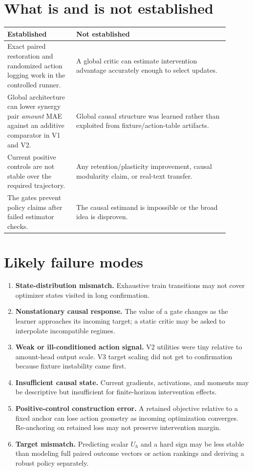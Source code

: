 \documentclass[11pt]{article}
\begin{document}
\section{What is and is not established}
\begin{tabular}{p{0.28\linewidth}p{0.62\linewidth}}
\toprule
Established & Not established\\
\midrule
Exact paired restoration and randomized action logging work in the controlled runner. & A global critic can estimate intervention advantage accurately enough to select updates.\\
Global architecture can lower synergy pair \emph{amount} MAE against an additive comparator in V1 and V2. & Global causal structure was learned rather than exploited from fixture/action-table artifacts.\\
Current positive controls are not stable over the required trajectory. & Any retention/plasticity improvement, causal modularity claim, or real-text transfer.\\
The gates prevent policy claims after failed estimator checks. & The causal estimand is impossible or the broad idea is disproven.\\
\bottomrule
\end{tabular}

\section{Likely failure modes}
\begin{enumerate}
\item \textbf{State-distribution mismatch.} Exhaustive train transitions may not cover optimizer states visited in long confirmation.
\item \textbf{Nonstationary causal response.} The value of a gate changes as the learner approaches its incoming target; a static critic may be asked to interpolate incompatible regimes.
\item \textbf{Weak or ill-conditioned action signal.} V2 utilities were tiny relative to amount-head output scale. V3 target scaling did not get to confirmation because fixture instability came first.
\item \textbf{Insufficient causal state.} Current gradients, activations, and moments may be descriptive but insufficient for finite-horizon intervention effects.
\item \textbf{Positive-control construction error.} A retained objective relative to a fixed anchor can lose action geometry as incoming optimization converges. Re-anchoring on retained loss may not preserve intervention margin.
\item \textbf{Target mismatch.} Predicting scalar $U_h$ and a hard sign may be less stable than modeling full paired outcome vectors or action rankings and deriving a robust policy separately.
\end{enumerate}
\end{document}
